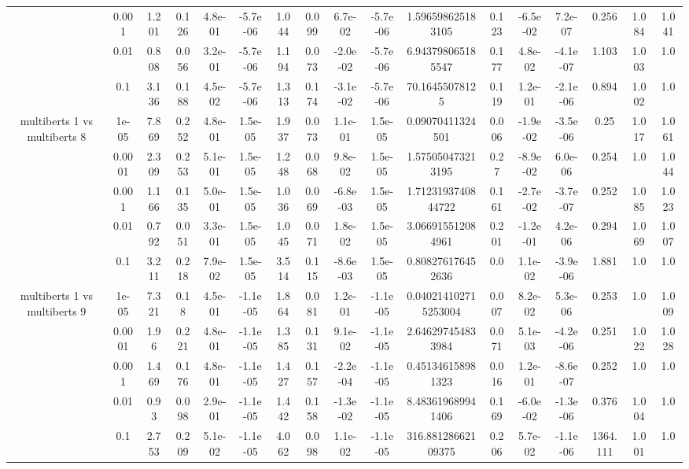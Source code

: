 \begin{tabular}{|c|c|c|c|c|c|c|c|c|c|c|c|c|c|c|c|c|}
 & 0.001 & 1.201 & 0.126 & 4.8e-01 & -5.7e-06 & 1.044 & 0.099 & 6.7e-02 & -5.7e-06 & 1.596598625183105 & 0.123 & -6.5e-02 & 7.2e-07 & 0.256 & 1.084 & 1.041 \\
 & 0.01 & 0.808 & 0.056 & 3.2e-01 & -5.7e-06 & 1.194 & 0.073 & -2.0e-02 & -5.7e-06 & 6.943798065185547 & 0.177 & 4.8e-02 & -4.1e-07 & 1.103 & 1.003 & 1.0 \\
 & 0.1 & 3.136 & 0.188 & 4.5e-02 & -5.7e-06 & 1.313 & 0.174 & -3.1e-02 & -5.7e-06 & 70.16455078125 & 0.119 & 1.2e-01 & -2.1e-06 & 0.894 & 1.002 & 1.0 \\
\hline
\multirow{5}{*}{multiberts 1 vs multiberts 8} & 1e-05 & 7.869 & 0.252 & 4.8e-01 & 1.5e-05 & 1.937 & 0.073 & 1.1e-01 & 1.5e-05 & 0.09070411324501 & 0.006 & -1.9e-02 & -3.5e-06 & 0.25 & 1.017 & 1.061 \\
 & 0.0001 & 2.309 & 0.253 & 5.1e-01 & 1.5e-05 & 1.248 & 0.068 & 9.8e-02 & 1.5e-05 & 1.575050473213195 & 0.27 & -8.9e-02 & 6.0e-06 & 0.254 & 1.0 & 1.044 \\
 & 0.001 & 1.166 & 0.135 & 5.0e-01 & 1.5e-05 & 1.036 & 0.069 & -6.8e-03 & 1.5e-05 & 1.7123193740844722 & 0.161 & -2.7e-02 & -3.7e-07 & 0.252 & 1.085 & 1.023 \\
 & 0.01 & 0.792 & 0.051 & 3.3e-01 & 1.5e-05 & 1.045 & 0.071 & 1.8e-02 & 1.5e-05 & 3.066915512084961 & 0.201 & -1.2e-01 & 4.2e-06 & 0.294 & 1.069 & 1.007 \\
 & 0.1 & 3.211 & 0.218 & 7.9e-02 & 1.5e-05 & 3.514 & 0.115 & -8.6e-03 & 1.5e-05 & 0.808276176452636 & 0.0 & 1.1e-02 & -3.9e-06 & 1.881 & 1.0 & 1.0 \\
\hline
\multirow{5}{*}{multiberts 1 vs multiberts 9} & 1e-05 & 7.321 & 0.18 & 4.5e-01 & -1.1e-05 & 1.864 & 0.081 & 1.2e-01 & -1.1e-05 & 0.040214102715253004 & 0.007 & 8.2e-02 & 5.3e-06 & 0.253 & 1.0 & 1.009 \\
 & 0.0001 & 1.96 & 0.221 & 4.8e-01 & -1.1e-05 & 1.385 & 0.131 & 9.1e-02 & -1.1e-05 & 2.646297454833984 & 0.071 & 5.1e-03 & -4.2e-06 & 0.251 & 1.022 & 1.028 \\
 & 0.001 & 1.469 & 0.176 & 4.8e-01 & -1.1e-05 & 1.427 & 0.157 & -2.2e-04 & -1.1e-05 & 0.451346158981323 & 0.016 & 1.2e-01 & -8.6e-07 & 0.252 & 1.0 & 1.0 \\
 & 0.01 & 0.93 & 0.098 & 2.9e-01 & -1.1e-05 & 1.442 & 0.158 & -1.3e-02 & -1.1e-05 & 8.483619689941406 & 0.169 & -6.0e-02 & -1.3e-06 & 0.376 & 1.004 & 1.0 \\
 & 0.1 & 2.753 & 0.209 & 5.1e-02 & -1.1e-05 & 4.062 & 0.098 & 1.1e-02 & -1.1e-05 & 316.88128662109375 & 0.206 & 5.7e-02 & -1.1e-06 & 1364.111 & 1.001 & 1.0 \\

\end{tabular}
